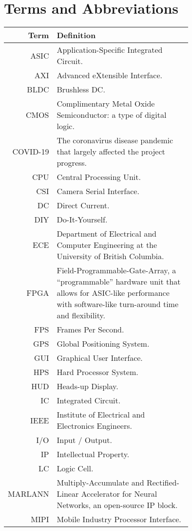 \section*{Terms and Abbreviations}

\begin{tabular}[h]{rp{0.75\linewidth}}
    \hline
    \textbf{Term} & \textbf{Definition}\\
    \hline

    ASIC & Application-Specific Integrated Circuit.\\
    AXI & Advanced eXtensible Interface. \\
    BLDC & Brushless DC. \\
    CMOS & Complimentary Metal Oxide Semiconductor: a type of digital logic. \\
    COVID-19 & The coronavirus disease pandemic that largely affected the project progress. \\
    CPU & Central Processing Unit. \\
    CSI & Camera Serial Interface. \\
    DC & Direct Current. \\
    DIY & Do-It-Yourself. \\
    ECE & Department of Electrical and Computer Engineering at the University of British Columbia.\\
    FPGA & Field-Programmable-Gate-Array, a ``programmable'' hardware unit that allows for ASIC-like performance with software-like turn-around time and flexibility.\\
    FPS & Frames Per Second.\\
    GPS & Global Positioning System. \\
    GUI & Graphical User Interface. \\
    HPS & Hard Processor System. \\
    HUD & Heads-up Display. \\
    IC & Integrated Circuit. \\
    IEEE & Institute of Electrical and Electronics Engineers. \\
    I/O & Input / Output. \\
    IP & Intellectual Property. \\
    LC & Logic Cell. \\
    MARLANN & Multiply-Accumulate and Rectified-Linear Accelerator for Neural Networks, an open-source IP block. \\
    MIPI & Mobile Industry Processor Interface. \\

\end{tabular}
